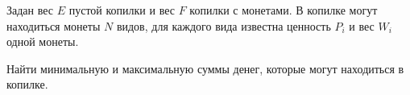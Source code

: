 Задан вес $E$ пустой копилки и вес $F$ копилки с монетами. В копилке
могут находиться монеты $N$ видов, для каждого вида известна ценность
$P_i$ и вес $W_i$ одной монеты.

Найти минимальную и максимальную суммы денег, которые могут находиться
в копилке.
